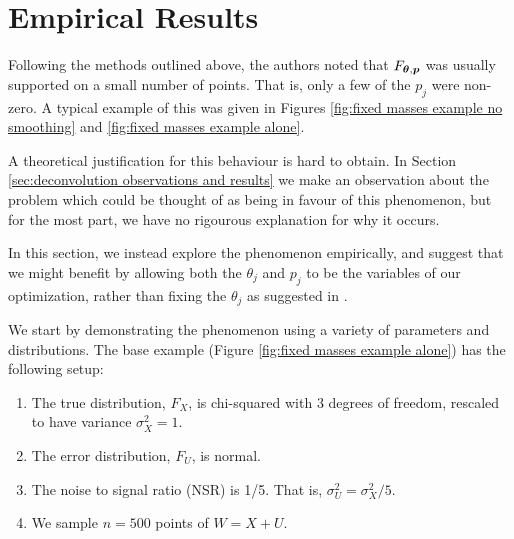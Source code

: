 
\section{Empirical Results}
\label{sec:deconvolution empirical results}
	Following the methods outlined above, the authors noted that $F_{{\bm{{\theta}}}, {\bm{{p}}}}$ was usually supported on a small number of points. That is, only a few of the $p_j$ were non-zero. A typical example of this was given in Figures \ref{fig:fixed masses example no smoothing} and \ref{fig:fixed masses example alone}.


	A theoretical justification for this behaviour is hard to obtain. In Section \ref{sec:deconvolution observations and results} we make an observation about the problem which could be thought of as being in favour of this phenomenon, but for the most part, we have no rigourous explanation for why it occurs.

	In this section, we instead explore the phenomenon empirically, and suggest that we might benefit by allowing both the $\theta_j$ and $p_j$ to be the variables of our optimization, rather than fixing the $\theta_j$ as suggested in \cite{Delaigle2016-la}.

	We start by demonstrating the phenomenon using a variety of parameters and distributions. The base example (Figure \ref{fig:fixed masses example alone}) has the following setup:

	\begin{enumerate}
		\item The true distribution, $F_X$, is chi-squared with 3 degrees of freedom, rescaled to have variance $\sigma_X^2 = 1$.
		\label{enum: true F_X chi-squared}
		\item The error distribution, $F_U$, is normal.
		\label{enum: error F_U normal}
		\item The noise to signal ratio (NSR) is 1/5. That is, $\sigma_U^2 = \sigma_X^2 / 5$.
		\label{enum: NSR 1/5}
		\item We sample $n = 500$ points of $W = X+U$.
		\label{enum: n 500}
	\end{enumerate}

